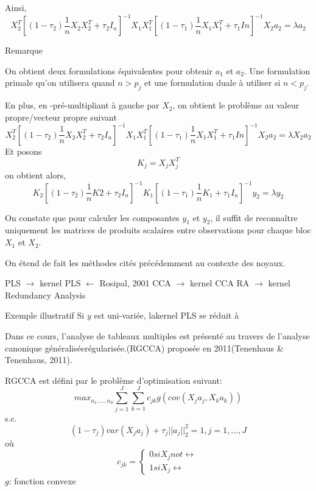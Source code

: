 \documentclass{article}
\begin{document}
Ainsi,
\begin{equation}
X_2^T[(1-\tau_2)\frac{1}{n}X_2X_2^T+\tau_2I_n]^{-1} X_1X_1^T[(1-\tau_1)\frac{1}{n}X_1X_1^T+\tau_1In]^{-1}X_2a_2=\lambda a_2
\end{equation}

Remarque

On obtient deux formulations \'equivalentes pour obtenir $a_1$ et $a_2$. Une formulation primale qu'on utilisera quand $n>p_j$ et une formulation duale \`a utiliser si $n<p_j$.

En plus, en -pr\'e-multipliant \`a gauche par $X_2$, on obtient le probl\`eme au valeur propre/vecteur propre suivant
\begin{equation}
X_2^T[(1-\tau_2)\frac{1}{n}X_2X_2^T+\tau_2I_n]^{-1} X_1X_1^T[(1-\tau_1)\frac{1}{n}X_1X_1^T+\tau_1In]^{-1}X_2a_2=\lambda X_2a_2
\end{equation}
Et posons
\begin{equation}
K_j=X_jX_j^T
\end{equation}
on obtient alors,
\begin{equation}
K_2[(1-\tau_2)\frac{1}{n}K2+\tau_2 I_n]^{-1}K_1 [(1-\tau_1)\frac{1}{n}K_1+\tau_1I_n]^{-1}y_2=\lambda y_2
\end{equation}

On constate que pour calculer les composantes $y_1$ et $y_2$, il suffit de reconna\^itre uniquement les matrices de produits scalaires entre observations pour chaque bloc $X_1$ et $X_2$.

On \'etend de fait les m\'ethodes cit\'es pr\'ec\'edemment au contexte des noyaux.

PLS $\to$ kernel PLS $\leftarrow$ Rosipal, 2001
CCA $\to$ kernel CCA
RA $\to$ kernel Redundancy Analysis


Exemple illustratif
Si $y$ est uni-vari\'ee, lakernel PLS se r\'eduit \`a 

Dans ce cours, l'analyse de tableaux multiples est pr\'esent\'e au travers de l'analyse canonique g\'en\'eralis\'eer\'egularis\'ee.(RGCCA) propos\'ee en 2011(Tenenhaus & Tenenhaus, 2011).

RGCCA est d\'efini par le probl\`eme d'optimisation suivant:
\begin{equation}
max_{a_1, \ldots,a_S} \sum_{j=1}^J \sum_{k=1}^J c_{jk} g(cov(X_ja_j,X_ka_k))
\end{equation}
s.c.
\begin{equation}
(1-\tau_j) var(X_ja_j)+\tau_j||a_j||_2^2=1,j=1,\ldots,J
\end{equation}
o\`u
\begin{equation}
c_{jk}=\left\{\begin{array}{lll}
0 si X_j not \leftrightarrow \\
1 si X_j \leftrightarrow 
\end{array}\right.
\end{equation}
$g$: fonction convexe
\end{document}
